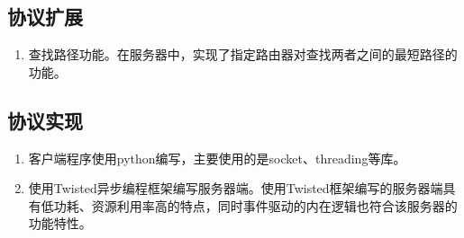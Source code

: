 	\subsection{协议扩展} %
	\label{sub:协议扩展}
		\begin{enumerate}
			\item 查找路径功能。在服务器中，实现了指定路由器对查找两者之间的最短路径的功能。			
		\end{enumerate}
	\subsection{协议实现} %
	\label{sub:协议实现}
		\begin{enumerate}
			\item 客户端程序使用python编写，主要使用的是socket、threading等库。
			\item 使用Twisted异步编程框架编写服务器端。使用Twisted框架编写的服务器端具有低功耗、资源利用率高的特点，同时事件驱动的内在逻辑也符合该服务器的功能特性。
		\end{enumerate}
